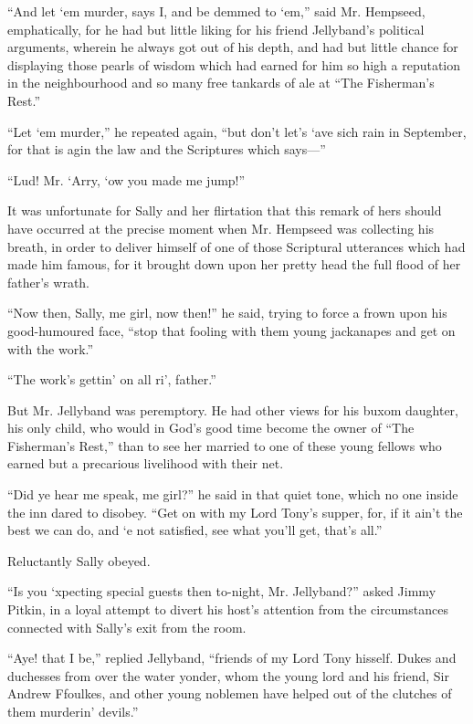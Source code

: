 \documentclass[paper=5.5in:8.5in,BCOR=7mm,twoside,DIV=calc,12pt,usegeometry,chapterprefix,endperiod,headings=big]{scrbook}
\begin{document}
\enquote{And let `em murder, says I, and be demmed to `em,} said Mr. Hempseed, emphatically, for he had but little liking for his friend Jellyband's political arguments, wherein he always got out of his depth, and had but little chance for displaying those pearls of wisdom which had earned for him so high a reputation in the neighbourhood and so many free tankards of ale at \enquote{The Fisherman's Rest.}

\enquote{Let `em murder,} he repeated again, \enquote{but don't let's `ave sich rain in September, for that is agin the law and the Scriptures which says---}

\enquote{Lud! Mr. `Arry, `ow you made me jump!}

It was unfortunate for Sally and her flirtation that this remark of hers should have occurred at the precise moment when Mr. Hempseed was collecting his breath, in order to deliver himself of one of those Scriptural utterances which had made him famous, for it brought down upon her pretty head the full flood of her father's wrath.

\enquote{Now then, Sally, me girl, now then!} he said, trying to force a frown upon his good-humoured face, \enquote{stop that fooling with them young jackanapes and get on with the work.}

\enquote{The work's gettin’ on all ri’, father.}

But Mr. Jellyband was peremptory. He had other views for his buxom daughter, his only child, who would in God's good time become the owner of \enquote{The Fisherman's Rest,} than to see her married to one of these young fellows who earned but a precarious livelihood with their net.

\enquote{Did ye hear me speak, me girl?} he said in that quiet tone, which no one inside the inn dared to disobey. \enquote{Get on with my Lord Tony's supper, for, if it ain't the best we can do, and `e not satisfied, see what you'll get, that's all.}

Reluctantly Sally obeyed.

\enquote{Is you `xpecting special guests then to-night, Mr. Jellyband?} asked Jimmy Pitkin, in a loyal attempt to divert his host's attention from the circumstances connected with Sally's exit from the room.

\enquote{Aye! that I be,} replied Jellyband, \enquote{friends of my Lord Tony hisself. Dukes and duchesses from over the water yonder, whom the young lord and his friend, Sir Andrew Ffoulkes, and other young noblemen have helped out of the clutches of them murderin’ devils.}
\end{document}
